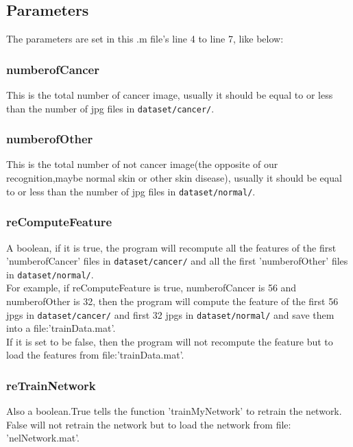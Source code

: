 \documentclass[14pt]{report} %
\begin{document}
\subsection{Parameters}
	The parameters are set in this .m file's line 4 to line 7, like below:
	
\subsubsection{numberofCancer}
	This is the total number of cancer image, usually it should be equal to or less than the number of jpg files in \verb|dataset/cancer/|.
	\label{par:numberofCancer} 
\subsubsection{numberofOther}
	This is the total number of not cancer image(the opposite of our recognition,maybe normal skin or other skin disease), usually it should be equal to or less than the number of jpg files in \verb|dataset/normal/|.
	\label{par:numberofOther} 
\subsubsection{reComputeFeature}
	A boolean, if it is true, the program will recompute all the features of the first 'numberofCancer' files in \verb|dataset/cancer/| and all the first 'numberofOther' files in \verb|dataset/normal/|.\\
	For example, if reComputeFeature is true, numberofCancer is 56 and numberofOther is 32, then the program will compute the feature of the first 56 jpgs in \verb|dataset/cancer/| and first 32 jpgs in \verb|dataset/normal/| and save them into a file:'trainData.mat'.
	\\If it is set to be false, then the program will not recompute the feature but to load the features from file:'trainData.mat'.
	\label{par:reComputeFeature} 
\subsubsection{reTrainNetwork}
	Also a boolean.True tells the function 'trainMyNetwork' to retrain the network.	False will not retrain the network but to load the network from file: 'nelNetwork.mat'.
	\label{par:reTrainNetwork} 
\end{document}
